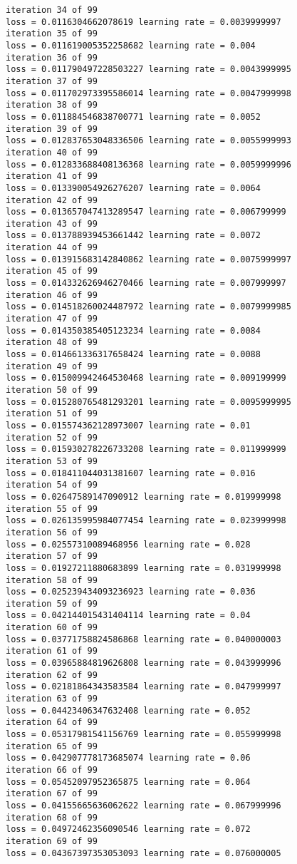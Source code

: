 \documentclass[11pt]{article}
\begin{document}
\begin{Verbatim}[commandchars=\\\{\}]
iteration 34 of 99
loss = 0.0116304662078619 learning rate = 0.0039999997
iteration 35 of 99
loss = 0.011619005352258682 learning rate = 0.004
iteration 36 of 99
loss = 0.011790497228503227 learning rate = 0.0043999995
iteration 37 of 99
loss = 0.011702973395586014 learning rate = 0.0047999998
iteration 38 of 99
loss = 0.011884546838700771 learning rate = 0.0052
iteration 39 of 99
loss = 0.012837653048336506 learning rate = 0.0055999993
iteration 40 of 99
loss = 0.012833688408136368 learning rate = 0.0059999996
iteration 41 of 99
loss = 0.013390054926276207 learning rate = 0.0064
iteration 42 of 99
loss = 0.013657047413289547 learning rate = 0.006799999
iteration 43 of 99
loss = 0.013788939453661442 learning rate = 0.0072
iteration 44 of 99
loss = 0.013915683142840862 learning rate = 0.0075999997
iteration 45 of 99
loss = 0.014332626946270466 learning rate = 0.007999997
iteration 46 of 99
loss = 0.014518260024487972 learning rate = 0.0079999985
iteration 47 of 99
loss = 0.014350385405123234 learning rate = 0.0084
iteration 48 of 99
loss = 0.014661336317658424 learning rate = 0.0088
iteration 49 of 99
loss = 0.015009942464530468 learning rate = 0.009199999
iteration 50 of 99
loss = 0.015280765481293201 learning rate = 0.0095999995
iteration 51 of 99
loss = 0.015574362128973007 learning rate = 0.01
iteration 52 of 99
loss = 0.015930278226733208 learning rate = 0.011999999
iteration 53 of 99
loss = 0.018411044031381607 learning rate = 0.016
iteration 54 of 99
loss = 0.02647589147090912 learning rate = 0.019999998
iteration 55 of 99
loss = 0.026135995984077454 learning rate = 0.023999998
iteration 56 of 99
loss = 0.02557310089468956 learning rate = 0.028
iteration 57 of 99
loss = 0.01927211880683899 learning rate = 0.031999998
iteration 58 of 99
loss = 0.025239434093236923 learning rate = 0.036
iteration 59 of 99
loss = 0.042144015431404114 learning rate = 0.04
iteration 60 of 99
loss = 0.03771758824586868 learning rate = 0.040000003
iteration 61 of 99
loss = 0.03965884819626808 learning rate = 0.043999996
iteration 62 of 99
loss = 0.02181864343583584 learning rate = 0.047999997
iteration 63 of 99
loss = 0.04423406347632408 learning rate = 0.052
iteration 64 of 99
loss = 0.05317981541156769 learning rate = 0.055999998
iteration 65 of 99
loss = 0.042907778173685074 learning rate = 0.06
iteration 66 of 99
loss = 0.05452097952365875 learning rate = 0.064
iteration 67 of 99
loss = 0.04155665636062622 learning rate = 0.067999996
iteration 68 of 99
loss = 0.04972462356090546 learning rate = 0.072
iteration 69 of 99
loss = 0.04367397353053093 learning rate = 0.076000005

\end{Verbatim}
\end{document}
